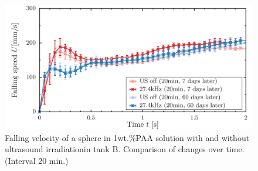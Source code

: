 \begin{figure}[ht]
    \centering
    \includegraphics[width=12cm,clip]{X-Appendix/20.png}
    \caption{Falling velocity of a sphere in 1wt.\%PAA solution with and without ultrasound irradiationin tank B. Comparison of changes over time. (Interval 20 min.)}
    \label{fig:falling-20-2}
\end{figure}
